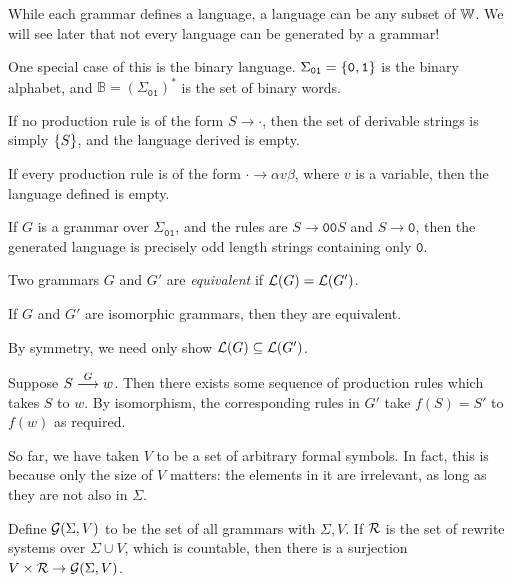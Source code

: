 \documentclass{article}
\begin{document}
\begin{note}
	While each grammar defines a language, a language can be any subset of $\mathbb{W}$. We will see later that not every language can be generated by a grammar!
\end{note}

\begin{note}
	One special case of this is the binary language. $\Sigma_{\texttt{01}} = \left\lbrace \texttt{0}, \texttt{1} \right\rbrace$ is the binary alphabet, and $\mathbb{B} = (\Sigma_{\texttt{01}})^*$ is the set of binary words.
\end{note}

\begin{example}
	If no production rule is of the form $S \to \cdot$, then the set of derivable strings is simply $\left\lbrace S \right\rbrace$, and the language derived is empty.
		
	If every production rule is of the form $\cdot \to \alpha v \beta$, where $v$ is a variable, then the language defined is empty.
		
	If $G$ is a grammar over $\Sigma_{\texttt{01}}$, and the rules are $S \to \texttt{00}S$ and $S \to \texttt{0}$, then the generated language is precisely odd length strings containing only $\texttt{0}$.
\end{example}

\begin{definition}
	\label{equivalence-grammars}
	Two grammars $G$ and $G'$ are \textit{equivalent} if $\mathcal{L}(G) = \mathcal{L}(G')$.
\end{definition}

\begin{proposition}
	If $G$ and $G'$ are isomorphic grammars, then they are equivalent.
\end{proposition}

\begin{prf}
	By symmetry, we need only show $\mathcal{L}(G) \subseteq \mathcal{L}(G')$.
		
	Suppose $S \stackrel{G}{\longrightarrow} w$. Then there exists some sequence of production rules which takes $S$ to $w$. By isomorphism, the corresponding rules in $G'$ take $f(S) = S'$ to $f(w)$ as required.
\end{prf}

So far, we have taken $V$ to be a set of arbitrary formal symbols. In fact, this is because only the size of $V$ matters: the elements in it are irrelevant, as long as they are not also in $\Sigma$.

\begin{note}
	Define $\mathcal{G}(\Sigma, V)$ to be the set of all grammars with $\Sigma, V$. If $\mathcal{R}$ is the set of rewrite systems over $\Sigma \cup V$, which is countable, then there is a surjection $V \times \mathcal{R} \to \mathcal{G}(\Sigma, V)$.
\end{note}
\end{document}
